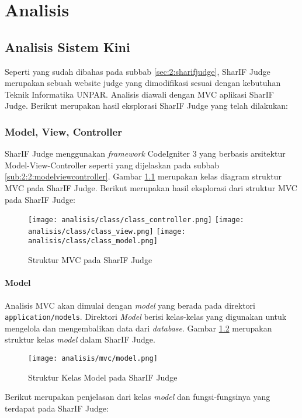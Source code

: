 \chapter{Analisis}
\label{chap:analisis}


\section{Analisis Sistem Kini}
\label{sec:3:sistemkini}

Seperti yang sudah dibahas pada subbab \ref{sec:2:sharifjudge}, SharIF Judge merupakan sebuah website judge yang dimodifikasi sesuai dengan kebutuhan Teknik Informatika UNPAR. Analisis diawali dengan MVC aplikasi SharIF Judge. Berikut merupakan hasil eksplorasi SharIF Judge yang telah dilakukan:

\subsection{Model, View, Controller}
\label{sub:3:1:modelviewcontroller}

SharIF Judge menggunakan \textit{framework} CodeIgniter 3 yang berbasis arsitektur Model-View-Controller seperti yang dijelaskan pada subbab \ref{sub:2:2:modelviewcontroller}. Gambar \ref{fig:3:1:mvc} merupakan kelas diagram struktur MVC pada SharIF Judge. Berikut merupakan hasil eksplorasi dari struktur MVC pada SharIF Judge:

\begin{figure}
	\centering
	\texttt{[image: analisis/class/class\_controller.png]}
	\texttt{[image: analisis/class/class\_view.png]}
	\texttt{[image: analisis/class/class\_model.png]}
	\caption{Struktur MVC pada SharIF Judge}
	\label{fig:3:1:mvc}
\end{figure}

\subsubsection{Model}
\label{sub:3:1:1:model}

Analisis MVC akan dimulai dengan \textit{model} yang berada pada direktori \verb|application/models|. Direktori \textit{Model} berisi kelas-kelas yang digunakan untuk mengelola dan mengembalikan data dari \textit{database}.
Gambar \ref{fig:3:1:1:model} merupakan struktur kelas \textit{model} dalam SharIF Judge.
\begin{figure}
	\centering
	\texttt{[image: analisis/mvc/model.png]}
	\caption{Struktur Kelas Model pada SharIF Judge}
	\label{fig:3:1:1:model}
\end{figure}
Berikut merupakan penjelasan dari kelas \textit{model} dan fungsi-fungsinya yang terdapat pada SharIF Judge:

